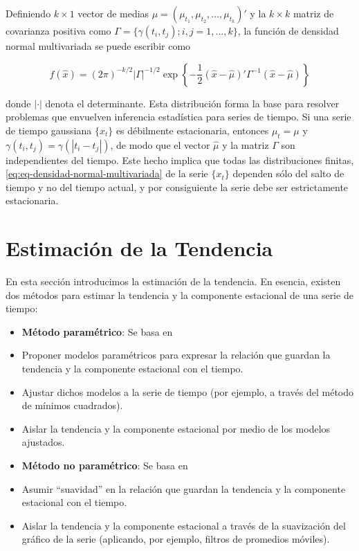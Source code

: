 \documentclass[12pt,]{krantz}
\providecommand{\tightlist}{%
  \setlength{\itemsep}{0pt}\setlength{\parskip}{0pt}}
\theoremstyle{definition}
\theoremstyle{definition}
\theoremstyle{definition}
\theoremstyle{remark}
\begin{document}
Definiendo \(k\times1\) vector de medias
\(\hat{\mu}=(\mu_{t_1},\mu_{t_2},\ldots,\mu_{t_k})'\) y la \(k\times k\)
matriz de covarianza positiva como
\(\Gamma=\{\gamma(t_i,t_j);i,j=1,\ldots,k\}\), la función de densidad
normal multivariada se puede escribir como

\begin{equation}
f(\hat{x})=(2\pi)^{-k/2}|\Gamma|^{-1/2}\exp\left\{-\frac{1}{2}(\hat{x}-\hat{\mu})'\Gamma^{-1}(\hat{x}-\hat{\mu})\right\}
\label{eq:eq-densidad-normal-multivariada}
\end{equation}

donde \(|\cdot|\) denota el determinante. Esta distribución forma la
base para resolver problemas que envuelven inferencia estadística para
series de tiempo. Si una serie de tiempo gaussiana \(\{x_t\}\) es
débilmente estacionaria, entonces \(\mu_t=\mu\) y
\(\gamma(t_i,t_j)=\gamma(|t_i-t_j|)\), de modo que el vector
\(\hat{\mu}\) y la matriz \(\Gamma\) son independientes del tiempo. Este
hecho implica que todas las distribuciones finitas,
\eqref{eq:eq-densidad-normal-multivariada} de la serie \(\{x_t\}\)
dependen sólo del salto de tiempo y no del tiempo actual, y por
consiguiente la serie debe ser estrictamente estacionaria.

\section{Estimación de la Tendencia}\label{estimacion-de-la-tendencia-1}

En esta sección introducimos la estimación de la tendencia. En esencia,
existen dos métodos para estimar la tendencia y la componente estacional
de una serie de tiempo:

\begin{itemize}
\tightlist
\item
  \textbf{Método paramétrico}: Se basa en
\item
  Proponer modelos paramétricos para expresar la relación que guardan la
  tendencia y la componente estacional con el tiempo.
\item
  Ajustar dichos modelos a la serie de tiempo (por ejemplo, a través del
  método de mínimos cuadrados).
\item
  Aislar la tendencia y la componente estacional por medio de los
  modelos ajustados.
\item
  \textbf{Método no paramétrico}: Se basa en
\item
  Asumir ``suavidad'' en la relación que guardan la tendencia y la
  componente estacional con el tiempo.
\item
  Aislar la tendencia y la componente estacional a través de la
  suavización del gráfico de la serie (aplicando, por ejemplo, filtros
  de promedios móviles).
\end{itemize}
\end{document}
